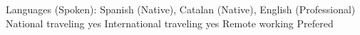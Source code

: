 \begin{cvskills}
\cvskill
{Languages (Spoken):} %
{Spanish (Native), Catalan (Native), English (Professional)} %
\cvskill
{National traveling} %
{yes}
\cvskill
{International traveling} %
{yes}
\cvskill
{Remote working}
{Prefered}
\end{cvskills}

